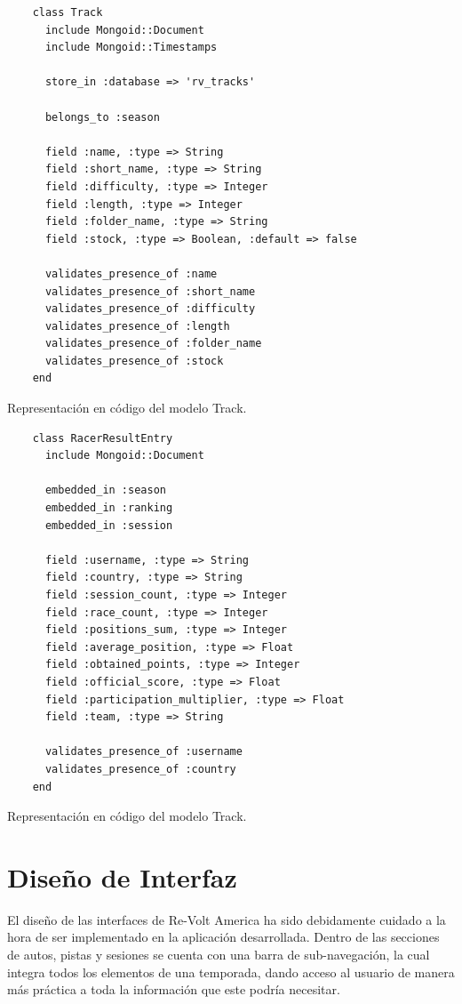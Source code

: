 \begin{listing}
  \begin{verbatim}
    class Track
      include Mongoid::Document
      include Mongoid::Timestamps
      
      store_in :database => 'rv_tracks'
      
      belongs_to :season
      
      field :name, :type => String
      field :short_name, :type => String
      field :difficulty, :type => Integer
      field :length, :type => Integer
      field :folder_name, :type => String
      field :stock, :type => Boolean, :default => false
      
      validates_presence_of :name
      validates_presence_of :short_name
      validates_presence_of :difficulty
      validates_presence_of :length
      validates_presence_of :folder_name
      validates_presence_of :stock
    end
  \end{verbatim}
  \caption[Esquema de Track]{Representación en código del modelo Track.}
\end{listing}

\begin{listing}
  \begin{verbatim}
    class RacerResultEntry
      include Mongoid::Document
      
      embedded_in :season
      embedded_in :ranking
      embedded_in :session
      
      field :username, :type => String
      field :country, :type => String
      field :session_count, :type => Integer
      field :race_count, :type => Integer
      field :positions_sum, :type => Integer
      field :average_position, :type => Float
      field :obtained_points, :type => Integer
      field :official_score, :type => Float
      field :participation_multiplier, :type => Float
      field :team, :type => String
      
      validates_presence_of :username
      validates_presence_of :country
    end
  \end{verbatim}
  \caption[Esquema de Track]{Representación en código del modelo Track.}
\end{listing}

\clearpage

\section{Diseño de Interfaz}
El diseño de las interfaces de Re-Volt America ha sido debidamente cuidado a la hora de ser implementado en la aplicación desarrollada.
Dentro de las secciones de autos, pistas y sesiones se cuenta con una barra de sub-navegación, la cual integra todos los elementos de una temporada, dando acceso al usuario de manera más práctica a toda la información que este podría necesitar.

